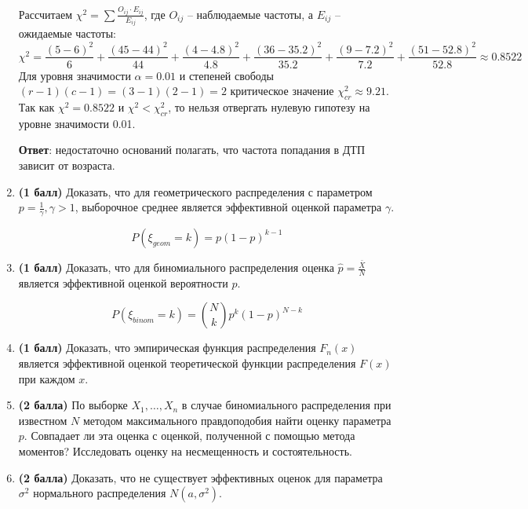 \documentclass{assignment}
\begin{document}
\begin{enumerate}
    Рассчитаем $\chi^2 = \sum \frac{O_{ij}\cdot E_{ij}}{E_{ij}}$, где $O_{ij}$ -- наблюдаемые частоты, а $E_{ij}$ -- ожидаемые частоты:
    \begin{equation*}
        \chi^2 = \frac{(5-6)^2}{6} + \frac{(45-44)^2}{44} + \frac{(4-4.8)^2}{4.8} + \frac{(36-35.2)^2}{35.2} + \frac{(9-7.2)^2}{7.2} + \frac{(51-52.8)^2}{52.8} \approx 0.8522
    \end{equation*}
    Для уровня значимости $\alpha = 0.01$ и степеней свободы $(r-1)(c-1) = (3-1)(2-1) = 2$ критическое значение $\chi^2_{cr} \approx 9.21$. Так как $\chi^2=0.8522$ и $\chi^2 < \chi^2_{cr}$, то нельзя отвергать нулевую гипотезу на уровне значимости 0.01.

    \textbf{Ответ}: недостаточно оснований полагать, что частота попадания в ДТП зависит от возраста.
    \finish

    \item \textbf{(1 балл)} Доказать, что для геометрического распределения с параметром $\displaystyle p = \frac{1}{\gamma}, \gamma > 1$, выборочное среднее является эффективной оценкой параметра $\gamma$.

    $$P(\xi_{geom} = k) = p(1 - p)^{k - 1}$$
    
    \item \textbf{(1 балл)} Доказать, что для биномиального распределения оценка $\displaystyle \hat{p} = \frac{\bar{X}}{N}$ является эффективной оценкой вероятности $p$.

    $$P(\xi_{binom} = k) = \binom{N}{k} p^{k}(1 - p)^{N - k}$$

    \item \textbf{(1 балл)} Доказать, что эмпирическая функция распределения $F_n(x)$ является эффективной оценкой теоретической функции распределения $F(x)$ при каждом $x$.

    \item \textbf{(2 балла)} По выборке $X_1, \ldots, X_n$ в случае биномиального распределения при известном $N$ методом максимального правдоподобия найти оценку параметра $p$. Совпадает ли эта оценка с оценкой, полученной с помощью метода моментов? Исследовать оценку на несмещенность и состоятельность.

    \item \textbf{(2 балла)} Доказать, что не существует эффективных оценок для параметра $\sigma^2$ нормального распределения $N(a, \sigma^2)$.


\end{enumerate}
\end{document}
